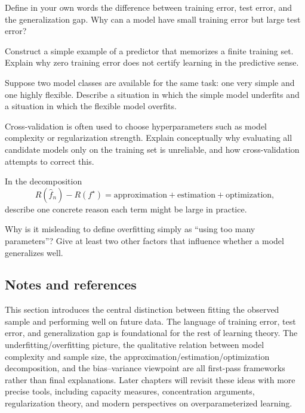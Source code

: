 \begin{exercise}
Define in your own words the difference between training error, test error, and the generalization gap. Why can a model have small training error but large test error?
\end{exercise}

\begin{exercise}
Construct a simple example of a predictor that memorizes a finite training set. Explain why zero training error does not certify learning in the predictive sense.
\end{exercise}

\begin{exercise}
Suppose two model classes are available for the same task: one very simple and one highly flexible. Describe a situation in which the simple model underfits and a situation in which the flexible model overfits.
\end{exercise}

\begin{exercise}
Cross-validation is often used to choose hyperparameters such as model complexity or regularization strength. Explain conceptually why evaluating all candidate models only on the training set is unreliable, and how cross-validation attempts to correct this.
\end{exercise}

\begin{exercise}
In the decomposition
\[
R(\hat f_n)-R(f^\star)
=
\text{approximation}+\text{estimation}+\text{optimization},
\]
describe one concrete reason each term might be large in practice.
\end{exercise}

\begin{exercise}
Why is it misleading to define overfitting simply as ``using too many parameters''? Give at least two other factors that influence whether a model generalizes well.
\end{exercise}

\subsection*{Notes and references}

This section introduces the central distinction between fitting the observed sample and performing well on future data. The language of training error, test error, and generalization gap is foundational for the rest of learning theory. The underfitting/overfitting picture, the qualitative relation between model complexity and sample size, the approximation/estimation/optimization decomposition, and the bias--variance viewpoint are all first-pass frameworks rather than final explanations. Later chapters will revisit these ideas with more precise tools, including capacity measures, concentration arguments, regularization theory, and modern perspectives on overparameterized learning.